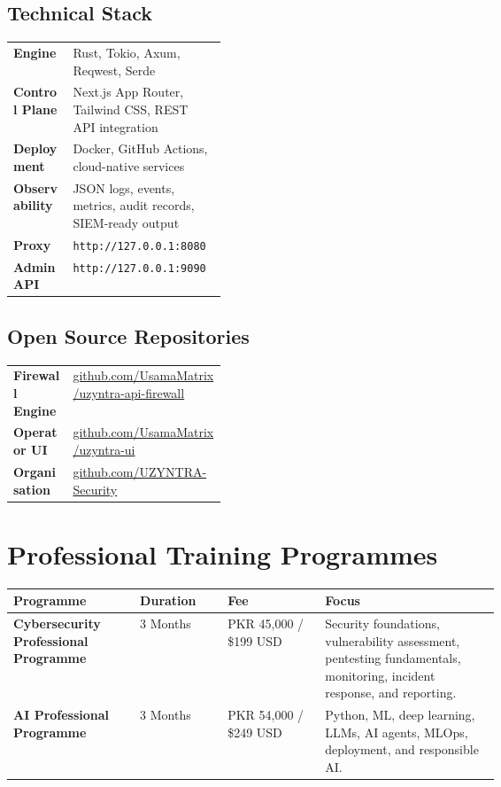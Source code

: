 \documentclass[11pt,a4paper]{article}
\begin{document}
\subsection{Technical Stack}
\begin{infobox}
\begin{tabularx}{\linewidth}{@{}>{\bfseries}p{0.28\linewidth}X@{}}
Engine & Rust, Tokio, Axum, Reqwest, Serde \\
Control Plane & Next.js App Router, Tailwind CSS, REST API integration \\
Deployment & Docker, GitHub Actions, cloud-native services \\
Observability & JSON logs, events, metrics, audit records, SIEM-ready output \\
Proxy & \texttt{http://127.0.0.1:8080} \\
Admin API & \texttt{http://127.0.0.1:9090} \\
\end{tabularx}
\end{infobox}

\subsection{Open Source Repositories}
\begin{infobox}
\begin{tabularx}{\linewidth}{@{}>{\bfseries}p{0.28\linewidth}X@{}}
Firewall Engine & \href{https://github.com/UsamaMatrix/uzyntra-api-firewall}{github.com/UsamaMatrix/uzyntra-api-firewall} \\
Operator UI & \href{https://github.com/UsamaMatrix/uzyntra-ui}{github.com/UsamaMatrix/uzyntra-ui} \\
Organisation & \href{https://github.com/UZYNTRA-Security}{github.com/UZYNTRA-Security} \\
\end{tabularx}
\end{infobox}

\section{Professional Training Programmes}
\begin{tabularx}{\linewidth}{@{}>{\bfseries}p{0.26\linewidth}p{0.18\linewidth}p{0.20\linewidth}X@{}}
\toprule
Programme & Duration & Fee & Focus \\
\midrule
Cybersecurity Professional Programme & 3 Months & PKR 45,000 / \$199 USD & Security foundations, vulnerability assessment, pentesting fundamentals, monitoring, incident response, and reporting. \\
AI Professional Programme & 3 Months & PKR 54,000 / \$249 USD & Python, ML, deep learning, LLMs, AI agents, MLOps, deployment, and responsible AI. \\
\bottomrule
\end{tabularx}
\end{document}
